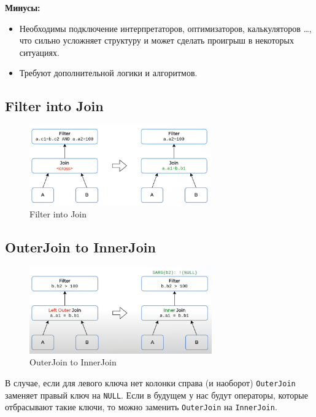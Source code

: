 \documentclass[11pt]{article}
\begin{document}
    \textbf{Минусы:}
    \begin{itemize}[label=-]
        \item Необходимы подключение интерпретаторов, оптимизаторов, калькуляторов \dots, что сильно усложняет структуру и может сделать проигрыш в некоторых ситуациях.
        \item Требуют дополнительной логики и алгоритмов.
    \end{itemize}

    \newpage

    \subsection{Filter into Join}

    \begin{figure}[h!]
        \centering
        \includegraphics[width=0.7\textwidth]{Pictures/Ключевые оптимизации/Filter into Join}
        \caption{Filter into Join}
    \end{figure}

    \subsection{OuterJoin to InnerJoin}

    \begin{figure}[h!]
        \centering
        \includegraphics[width=0.7\textwidth]{Pictures/Ключевые оптимизации/OuterJoin to InnerJoin}
        \caption{OuterJoin to InnerJoin}
    \end{figure}

    В случае, если для левого ключа нет колонки справа (и наоборот) \texttt{OuterJoin} заменяет правый ключ на \texttt{NULL}.
    Если в будущем у нас будут операторы, которые отбрасывают такие ключи, то можно заменить \texttt{OuterJoin} на \texttt{InnerJoin}.
\end{document}
